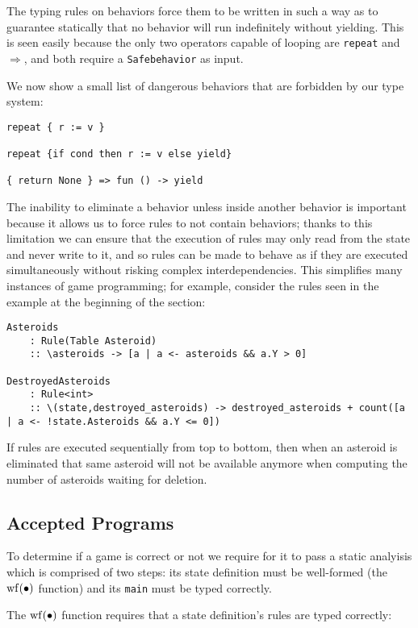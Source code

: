 The typing rules on behaviors force them to be written in such a way as to guarantee statically that no behavior will run indefinitely without yielding. This is seen easily because the only two operators capable of looping are \texttt{repeat} and $\Rightarrow$, and both require a \texttt{Safebehavior} as input. 

We now show a small list of dangerous behaviors that are forbidden by our type system:

\begin{lstlisting}
repeat { r := v }

repeat {if cond then r := v else yield}

{ return None } => fun () -> yield
\end{lstlisting}

The inability to eliminate a behavior unless inside another behavior is important because it allows us to force rules to not contain behaviors; thanks to this limitation we can ensure that the execution of rules may only read from the state and never write to it, and so rules can be made to behave as if they are executed simultaneously without risking complex interdependencies. This simplifies many instances of game programming; for example, consider the rules seen in the example at the beginning of the section:

\begin{lstlisting}
Asteroids           
    : Rule(Table Asteroid)
    :: \asteroids -> [a | a <- asteroids && a.Y > 0]
  	    
DestroyedAsteroids	
    : Rule<int>
    :: \(state,destroyed_asteroids) -> destroyed_asteroids + count([a | a <- !state.Asteroids && a.Y <= 0])
\end{lstlisting}

If rules are executed sequentially from top to bottom, then when an asteroid is eliminated that same asteroid will not be available anymore when computing the number of asteroids waiting for deletion.


\subsection{Accepted Programs}

To determine if a game is correct or not we require for it to pass a static analyisis which is comprised of two steps: its state definition must be well-formed (the $\operatorname{wf}(\bullet)$ function) and its \texttt{main} must be typed correctly.

The $\operatorname{wf}(\bullet)$ function requires that a state definition's rules are typed correctly:

